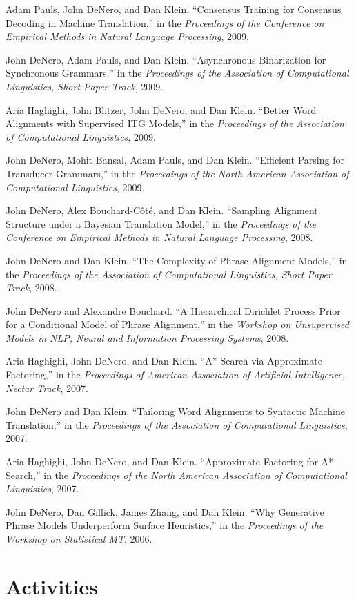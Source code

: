 \documentclass[margin,line]{res}
\begin{document}
\begin{resume}
Adam Pauls, John DeNero, and Dan Klein. ``Consensus Training for Consensus Decoding in Machine Translation,'' in the {\it Proceedings of the Conference on Empirical Methods in Natural Language Processing}, 2009.

John DeNero, Adam Pauls, and Dan Klein. ``Asynchronous Binarization for Synchronous Grammars,'' in the {\it Proceedings of the Association of Computational Linguistics, Short Paper Track}, 2009.

Aria Haghighi, John Blitzer, John DeNero, and Dan Klein. ``Better Word Alignments with Supervised ITG Models,'' in the {\it Proceedings of the Association of Computational Linguistics}, 2009.

John DeNero, Mohit Bansal, Adam Pauls, and Dan Klein. ``Efficient Parsing for Transducer Grammars,'' in the {\it Proceedings of the North American Association of Computational Linguistics}, 2009.

John DeNero, Alex Bouchard-Côté, and Dan Klein. ``Sampling Alignment Structure under a Bayesian Translation Model,'' in the {\it Proceedings of the Conference on Empirical Methods in Natural Language Processing}, 2008.

John DeNero and Dan Klein. ``The Complexity of Phrase Alignment Models,'' in the {\it Proceedings of the Association of Computational Linguistics, Short Paper Track}, 2008.

John DeNero and Alexandre Bouchard. ``A Hierarchical Dirichlet Process Prior for a Conditional Model of Phrase Alignment,'' in the {\it Workshop on Unsupervised Models in NLP, Neural and Information Processing Systems}, 2008.

Aria Haghighi, John DeNero, and Dan Klein. ``A* Search via Approximate Factoring,'' in the {\it Proceedings of American Association of Artificial Intelligence, Nectar Track}, 2007.

John DeNero and Dan Klein. ``Tailoring Word Alignments to Syntactic Machine Translation,'' in the {\it Proceedings of the Association of Computational Linguistics}, 2007.

Aria Haghighi, John DeNero, and Dan Klein. ``Approximate Factoring for A* Search,'' in the {\it Proceedings of the North American Association of Computational Linguistics}, 2007.

John DeNero, Dan Gillick, James Zhang, and Dan Klein. ``Why Generative Phrase Models Underperform Surface Heuristics,'' in the {\it Proceedings of the Workshop on Statistical MT}, 2006.

\section{\sc Activities}


\end{resume}
\end{document}
